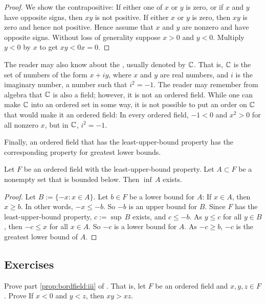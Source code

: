 \begin{proof}
We show the contrapositive: If either one of $x$ or $y$ is zero, or
if $x$ and $y$ have opposite signs, then $xy$ is not positive.
If either
$x$ or $y$ is zero, then $xy$ is zero and hence not positive.
Hence assume that $x$ and $y$ are nonzero and have
opposite signs.
Without loss of
generality suppose $x > 0$ and $y < 0$.  Multiply $y < 0$ by $x$ to get
$xy < 0x = 0$.
\end{proof}

\begin{example} \label{example:complexfield}
The reader may also know about the \emph{},
usually denoted by
${\mathbb{C}}$.  That is, ${\mathbb{C}}$ is the set of numbers of
the form $x + iy$, where $x$ and $y$ are real numbers, and $i$ is the
imaginary number, a number such that $i^2 = -1$.  The reader may
remember from algebra that ${\mathbb{C}}$ is also a field; however, it is not an
ordered field.  While one can make ${\mathbb{C}}$ into an ordered set in some way,
it is not possible to put an
order on ${\mathbb{C}}$ that would make it an ordered field: In every ordered field,
$-1 < 0$ and $x^2 > 0$ for all nonzero $x$, but in ${\mathbb{C}}$, $i^2 = -1$.
\end{example}

Finally, an ordered field that has the least-upper-bound property has the
corresponding property for greatest lower bounds.

\begin{prop}
Let $F$ be an ordered field with the least-upper-bound property.
Let $A \subset F$ be a nonempty set that is bounded below.
Then $\inf\, A$ exists.
\end{prop}

\begin{proof}
Let $B := \{ -x : x \in A \}$. Let $b \in F$ be a lower bound for $A$:
If $x \in A$, then $x \geq b$. In other words, $-x \leq -b$.  So $-b$
is an upper bound for $B$.
Since $F$ has the least-upper-bound property, $c:=\sup\, B$ exists, and $c \leq -b$.
As $y \leq c$
for all $y \in B$, then $-c \leq x$ for all $x \in A$.
So
$-c$ is a lower bound for $A$.  As $-c \geq b$,
$-c$ is the greatest lower bound of $A$.
\end{proof}

\subsection{Exercises}

\begin{exercise}
Prove part \ref{prop:bordfield:iii} of .
That is, let $F$ be an ordered field and $x,y,z \in F$.  Prove
If $x < 0$ and $y < z$, then $xy > xz$.
\end{exercise}



